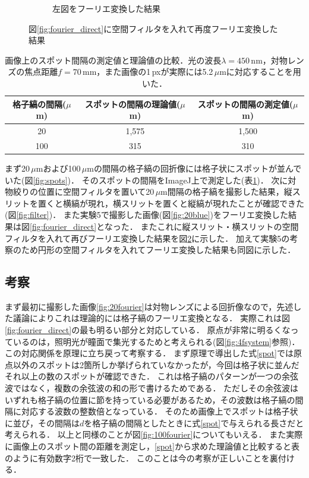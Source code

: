 \documentclass[titlepage]{jsarticle}
\begin{document}
\begin{figure}[htbp]
\begin{subfigure}{0.38\columnwidth}
        \caption{左図をフーリエ変換した結果}
        \label{fig:fourier_circle}
    \end{subfigure}  
    \caption{図\ref{fig:fourier_direct}に空間フィルタを入れて再度フーリエ変換した結果}
    \label{fig:fourier}
\end{figure}

\begin{table}[htbp]
    \centering
    \caption{画像上のスポット間隔の測定値と理論値の比較．光の波長$\lambda =450\,$nm，対物レンズの焦点距離$f=70$\,mm，また画像の1\,pxが実際には5.2\,$\mu$mに対応することを用いた．}
    \label{tab:spot}    
    \begin{tabular}{cc|c}
        格子縞の間隔($\mu$m) & スポットの間隔の理論値($\mu$m) & スポットの間隔の測定値($\mu$m)\\
        \hline\hline
        20 & 1,575 & 1,500\\
        100 & 315 & 310 \\
        \hline
    \end{tabular}
\end{table}

まず20\,$\mu$mおよび100\,$\mu$mの間隔の格子縞の回折像には格子状にスポットが並んでいた(図\ref{fig:spots})．
そのスポットの間隔をImageJ上で測定した(表\ref{tab:spot})．
次に対物絞りの位置に空間フィルタを置いて20\,$\mu$m間隔の格子縞を撮影した結果，縦スリットを置くと横縞が現れ，横スリットを置くと縦縞が現れたことが確認できた(図\ref{fig:filter})．
また実験5で撮影した画像(図\ref{fig:20blue})をフーリエ変換した結果は図\ref{fig:fourier_direct}となった．
またこれに縦スリット・横スリットの空間フィルタを入れて再びフーリエ変換した結果を図\ref{fig:fourier}に示した．
加えて実験5の考察のため円形の空間フィルタを入れてフーリエ変換した結果も同図に示した．

\subsection{考察}
まず最初に撮影した画像\ref{fig:20fourier}は対物レンズによる回折像なので，先述した議論によりこれは理論的には格子縞のフーリエ変換となる．
実際これは図\ref{fig:fourier_direct}の最も明るい部分と対応している．
原点が非常に明るくなっているのは，照明光が瞳面で集光するためと考えられる(図\ref{fig:4fsystem}参照)．
この対応関係を原理に立ち戻って考察する．
まず原理で導出した式\eqref{spot}では原点以外のスポットは2箇所しか挙げられていなかったが，今回は格子状に並んだそれ以上の数のスポットが確認できた．
これは格子縞のパターンが一つの余弦波ではなく，複数の余弦波の和の形で書けるためである．
ただしその余弦波はいずれも格子縞の位置に節を持っている必要があるため，その波数は格子縞の間隔に対応する波数の整数倍となっている．
そのため画像上でスポットは格子状に並び，その間隔は$d$を格子縞の間隔としたときに式\eqref{spot}で与えられる長さだと考えられる．
以上と同様のことが図\ref{fig:100fourier}についてもいえる．
また実際に画像上のスポット間の距離を測定し，\eqref{spot}から求めた理論値と比較すると表のように有効数字2桁で一致した．
このことは今の考察が正しいことを裏付ける．
\end{document}
